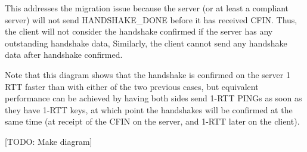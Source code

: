 \documentclass{article}
\begin{document}
This addresses the migration issue because the server (or at least
a compliant server) will not send HANDSHAKE\_DONE before it has
received CFIN. Thus, the client will not consider the handshake
confirmed if the server has any outstanding handshake data,
Similarly, the client cannot send any handshake data after handshake
confirmed.

Note that this diagram shows that the handshake is confirmed on the
server 1 RTT faster than with either of the two previous cases,
but equivalent performance can be achieved by having both
sides send 1-RTT PINGs as soon as they have 1-RTT keys,
at which point the handshakes will be confirmed at the same
time (at receipt of the CFIN on the server, and 1-RTT later
on the client).

[TODO: Make diagram]
\end{document}
